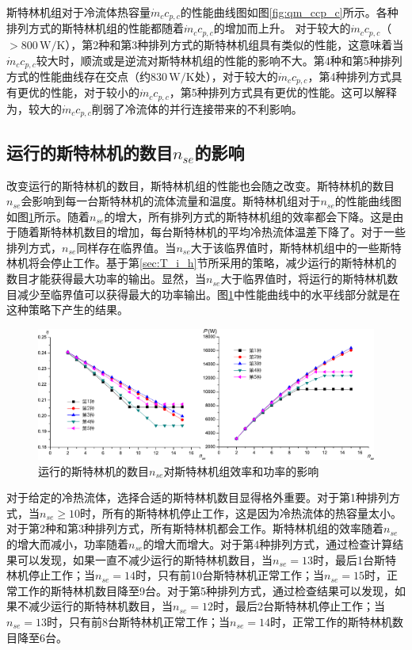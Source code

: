 斯特林机组对于冷流体热容量$\dot{m}_cc_{p,c}$的性能曲线图如图\ref{fig:qm_ccp_c}所示。各种排列方式的斯特林机组的性能都随着$\dot{m}_cc_{p,c}$的增加而上升。
对于较大的$\dot{m}_cc_{p,c}$（$> 800\,\mathrm{W/K}$），第2种和第3种排列方式的斯特林机组具有类似的性能，这意味着当$\dot{m}_cc_{p,c}$较大时，顺流或是逆流对斯特林机组的性能的影响不大。第4种和第5种排列方式的性能曲线存在交点（约$830\,\mathrm{W/K}$处），对于较大的$\dot{m}_cc_{p,c}$，第4种排列方式具有更优的性能，对于较小的$\dot{m}_cc_{p,c}$，第5种排列方式具有更优的性能。这可以解释为，较大的$\dot{m}_cc_{p,c}$削弱了冷流体的并行连接带来的不利影响。

\subsection{运行的斯特林机的数目$n_{se}$的影响}

改变运行的斯特林机的数目，斯特林机组的性能也会随之改变。斯特林机的数目$n_{se}$会影响到每一台斯特林机的流体流量和温度。斯特林机组对于$n_{se}$的性能曲线图如图\ref{fig:n_se}所示。随着$n_{se}$的增大，所有排列方式的斯特林机组的效率都会下降。这是由于随着斯特林机数目的增加，每台斯特林机的平均冷热流体温差下降了。对于一些排列方式，$n_{se}$同样存在临界值。当$n_{se}$大于该临界值时，斯特林机组中的一些斯特林机将会停止工作。基于第\ref{sec:T_i_h}节所采用的策略，减少运行的斯特林机的数目才能获得最大功率的输出。显然，当$n_{se}$大于临界值时，将运行的斯特林机数目减少至临界值可以获得最大的功率输出。图\ref{fig:n_se}中性能曲线中的水平线部分就是在这种策略下产生的结果。

\noindent \begin{figure}[htbp]
\begin{center}
	\includegraphics[width = 0.95\columnwidth]{fig/n_se}
	\caption{运行的斯特林机的数目$n_{se}$对斯特林机组效率和功率的影响}
	\label{fig:n_se}
\end{center}
\end{figure}

对于给定的冷热流体，选择合适的斯特林机数目显得格外重要。对于第1种排列方式，当$n_{se} \geqslant 10$时，所有的斯特林机停止工作，这是因为冷热流体的热容量太小。对于第2种和第3种排列方式，所有斯特林机都会工作。斯特林机组的效率随着$n_{se}$的增大而减小，功率随着$n_{se}$的增大而增大。对于第4种排列方式，通过检查计算结果可以发现，如果一直不减少运行的斯特林机数目，当$n_{se} = 13$时，最后1台斯特林机停止工作；当$n_{se} = 14$时，只有前10台斯特林机正常工作；当$n_{se} = 15$时，正常工作的斯特林机数目降至9台。对于第5种排列方式，通过检查结果可以发现，如果不减少运行的斯特林机数目，当$n_{se} = 12$时，最后2台斯特林机停止工作；当$n_{se} = 13$时，只有前8台斯特林机正常工作；当$n_{se} = 14$时，正常工作的斯特林机数目降至6台。

